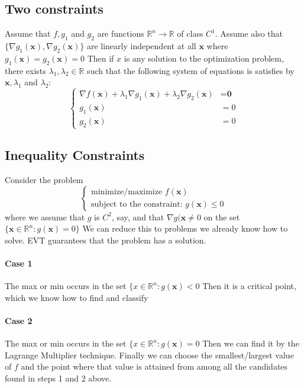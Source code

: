 \documentclass[11pt]{article}
\newcommand{\tb}[1]{\textbf{#1}}
\newcommand{\real}[0]{\mathbb{R}}
\begin{document}
\subsection{Two constraints}
Assume that $f, g_1$ and $g_2$ are functions $\real^n \rightarrow \real$ of class $C^1$. Assume also that $\{ \nabla g_1(\tb{x}), \nabla g_2(\tb{x})\}$ are linearly independent at all $\tb{x}$ where $g_1(\tb{x}) = g_2(\tb{x}) = 0$ \newline
Then if $x$ is any solution to the optimization problem, there exists $\lambda_1, \lambda_2 \in \real$ such that the following system of equations is satisfies by $\tb{x}, \lambda_1$ and $\lambda_2$:
\begin{equation*}
\begin{cases}
  \nabla f(\tb{x}) + \lambda_1 \nabla g_1(\tb{x}) + \lambda_2 \nabla g_2(\tb{x}) &= \tb{0} \\
  g_1(\tb{x}) &= 0\\
  g_2(\tb{x}) &= 0
\end{cases}
\end{equation*}
\subsection{Inequality Constraints}
Consider the problem
\begin{equation*}
    \begin{cases}
        \mbox{minimize/maximize } f(\tb{x})\\
        \mbox{subject to the constraint: } g(\tb{x}) \leq 0
    \end{cases}
\end{equation*}
where we assume that $g$ is $C^2$, say, and that $\nabla g(\tb{x} \neq 0$ on the set $\{\tb{x}\in \real^n: g(\tb{x}) = 0\}$ \newline
We can reduce this to problems we already know how to solve. EVT guarantees that the problem has a solution.
\paragraph{Case 1} The max or min occurs in the set $\{x\in \real^n: g(\tb{x}) < 0$ \newline
Then it is a critical point, which we know how to find and classify
\paragraph{Case 2} The max or min occurs in the set $\{x\in \real^n: g(\tb{x}) = 0$ \newline
Then we can find it by the Lagrange Multiplier technique. \newline
Finally we can choose the smallest/largest value of $f$ and the point where that value is attained from among all the candidates found in steps 1 and 2 above.
\end{document}

